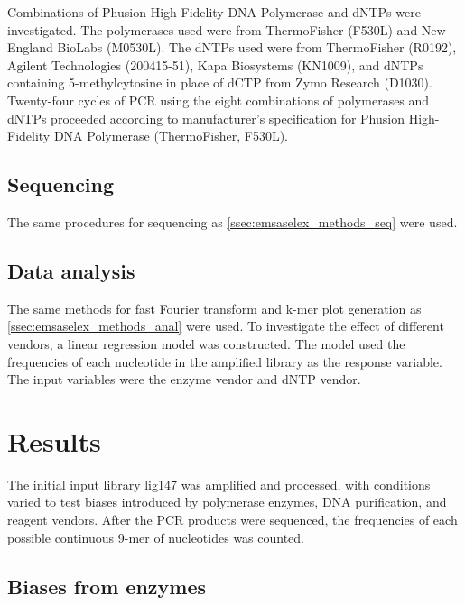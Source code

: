 \documentclass[parskip=full, numbers=noenddot]{scrreprt}
\begin{document}
Combinations of Phusion High-Fidelity DNA Polymerase and dNTPs were investigated.  The polymerases used were from ThermoFisher (F530L) and New England BioLabs (M0530L).  The dNTPs used were from ThermoFisher (R0192), Agilent Technologies (200415-51), Kapa Biosystems (KN1009), and dNTPs containing 5-methylcytosine in place of dCTP from Zymo Research (D1030).  Twenty-four cycles of PCR using the eight combinations of polymerases and dNTPs proceeded according to manufacturer's specification for Phusion High-Fidelity DNA Polymerase (ThermoFisher, F530L).

\subsection{Sequencing}
\label{ssec:pcrbias_methods_seq}

The same procedures for sequencing as \ref{ssec:emsaselex_methods_seq} were used.

\subsection{Data analysis}
\label{ssec:pcrbias_methods_anal}

The same methods for fast Fourier transform and k-mer plot generation as \ref{ssec:emsaselex_methods_anal} were used.
To investigate the effect of different vendors, a linear regression model was constructed.  The model used the frequencies of each nucleotide in the amplified library as the response variable.  The input variables were the enzyme vendor and dNTP vendor.

\section{Results}
\label{sec:pcrbias_results}

The initial input library lig147 was amplified and processed, with conditions varied to test biases introduced by polymerase enzymes, DNA purification, and reagent vendors.  After the PCR products were sequenced, the frequencies of each possible continuous 9-mer of nucleotides was counted.


\subsection{Biases from enzymes}
\label{ssec:pcrbias_result_enz}
\end{document}
